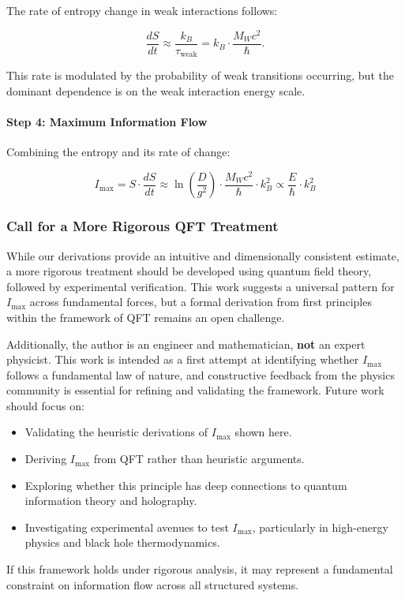 \documentclass[12pt]{article}
\begin{document}
The rate of entropy change in weak interactions follows:

\begin{equation}
    \frac{dS}{dt} \approx \frac{k_B}{\tau_{\text{weak}}} = k_B \cdot \frac{M_W c^2}{\hbar}.
\end{equation}

This rate is modulated by the probability of weak transitions occurring, but the dominant dependence is on the weak interaction energy scale.

\paragraph{Step 4: Maximum Information Flow}

Combining the entropy and its rate of change:

\begin{equation}
    I_{\max} = S \cdot \frac{dS}{dt} \approx \ln\left(\frac{D}{g^2}\right) \cdot \frac{M_W c^2}{\hbar} \cdot k_B^2 \propto \frac{E}{\hbar} \cdot k_B^2
\end{equation}


\subsubsection{Call for a More Rigorous QFT Treatment}

While our derivations provide an intuitive and dimensionally consistent estimate, a more rigorous treatment should be developed using quantum field theory, followed by experimental verification. This work suggests a universal pattern for $I_{\max}$ across fundamental forces, but a formal derivation from first principles within the framework of QFT remains an open challenge.

Additionally, the author is an engineer and mathematician, \textbf{not} an expert physicist. This work is intended as a first attempt at identifying whether $I_{\max}$ follows a fundamental law of nature, and constructive feedback from the physics community is essential for refining and validating the framework. Future work should focus on:
\begin{itemize}
    \item Validating the heuristic derivations of $I_{\max}$ shown here.
    \item Deriving $I_{\max}$ from QFT rather than heuristic arguments.
    \item Exploring whether this principle has deep connections to quantum information theory and holography.
    \item Investigating experimental avenues to test $I_{\max}$, particularly in high-energy physics and black hole thermodynamics.
\end{itemize}
If this framework holds under rigorous analysis, it may represent a fundamental constraint on information flow across all structured systems.
\end{document}
